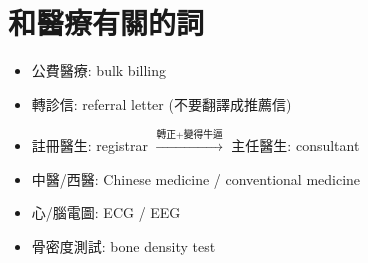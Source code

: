 \section{和醫療有關的詞}
\begin{itemize}
  \itemsep0em
  \item 公費醫療: bulk billing
  \item 轉診信: referral letter (不要翻譯成推薦信)
  \item 註冊醫生: registrar $\xrightarrow{\text{轉正+變得牛逼}}$ 主任醫生: consultant
  \item 中醫/西醫:  Chinese medicine / conventional medicine
  \item 心/腦電圖: ECG / EEG
  \item 骨密度測試: bone density test
\end{itemize}